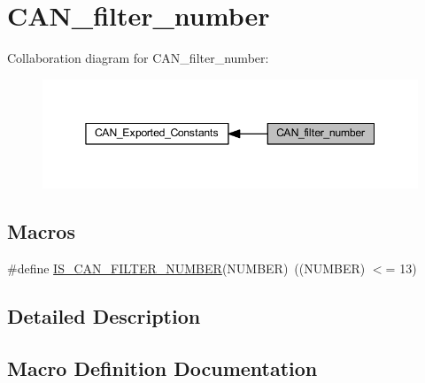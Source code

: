 \hypertarget{group___c_a_n__filter__number}{}\section{C\+A\+N\+\_\+filter\+\_\+number}
\label{group___c_a_n__filter__number}
Collaboration diagram for C\+A\+N\+\_\+filter\+\_\+number\+:
\nopagebreak
\begin{figure}[H]
\begin{center}
\leavevmode
\includegraphics[width=345pt]{group___c_a_n__filter__number}
\end{center}
\end{figure}
\subsection*{Macros}
\begin{DoxyCompactItemize}
\item 
\#define \hyperlink{group___c_a_n__filter__number_ga28d6c98a160d71059ed9a5973de2a4ef}{I\+S\+\_\+\+C\+A\+N\+\_\+\+F\+I\+L\+T\+E\+R\+\_\+\+N\+U\+M\+B\+ER}(N\+U\+M\+B\+ER)~((N\+U\+M\+B\+ER) $<$= 13)
\end{DoxyCompactItemize}


\subsection{Detailed Description}


\subsection{Macro Definition Documentation}
\mbox{\label{group___c_a_n__filter__number_ga28d6c98a160d71059ed9a5973de2a4ef}} 
